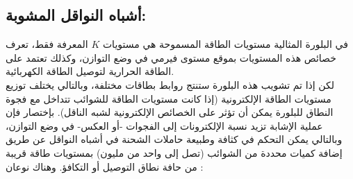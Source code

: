 \subsection{أشباه النواقل المشوبة:}
في البلورة المثالية مستويات الطاقة المسموحة هي مستويات $ K $ المعرفة فقط، تعرف خصائص هذه المستويات بموقع مستوى فيرمي في وضع التوازن، وكذلك تعتمد على الطاقة الحرارية لتوصيل الطاقة الكهربائية.
\\
لكن إذا تم تشويب هذه البلورة ستنتج روابط بطاقات مختلفة، وبالتالي يختلف توزيع مستويات الطاقة الإلكترونية (إذا كانت مستويات الطاقة للشوائب تتداخل مع فجوة النطاق للبلورة يمكن أن تؤثر على الخصائص الإلكترونية لشبه الناقل). بإختصار فإن عملية الإشابة تزيد نسبة الإلكترونات إلى الفجوات -أو العكس- في وضع التوازن، وبالتالي يمكن التحكم في كثافة وطبيعة حاملات الشحنة في أشباه النواقل عن طريق إضافة كميات محددة من الشوائب (تصل إلى واحد من مليون)  بمستويات طاقة قريبة من حافة نطاق التوصيل أو التكافؤ. وهناك نوعان :
